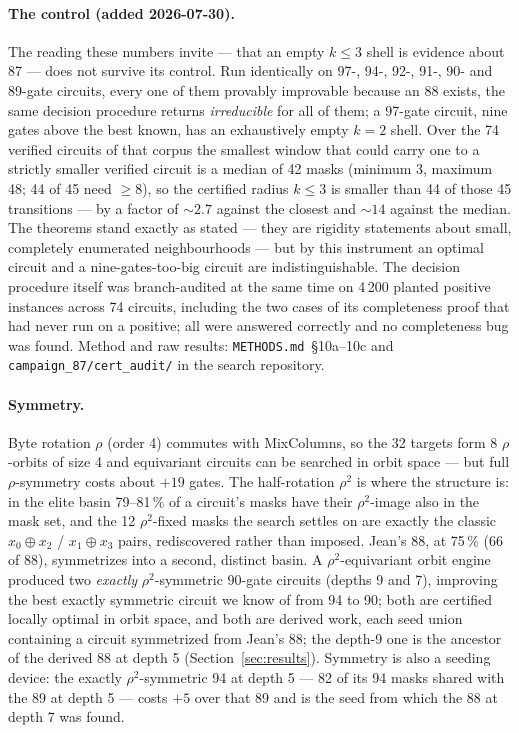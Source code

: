 \documentclass[11pt,a4paper]{article}
\begin{document}
\paragraph{The control (added 2026-07-30).} The reading these numbers invite ---
that an empty $k \le 3$ shell is evidence about 87 --- does not survive its
control. Run identically on 97-, 94-, 92-, 91-, 90- and 89-gate circuits, every
one of them provably improvable because an 88 exists, the same decision
procedure returns \emph{irreducible} for all of them; a 97-gate circuit, nine
gates above the best known, has an exhaustively empty $k=2$ shell. Over the 74
verified circuits of that corpus the smallest window that could carry one to a
strictly smaller verified circuit is a median of 42 masks (minimum 3, maximum
48; 44 of 45 need $\ge 8$), so the certified radius $k \le 3$ is smaller than 44
of those 45 transitions --- by a factor of ${\sim}2.7$ against the closest and
${\sim}14$ against the median. The theorems
stand exactly as stated --- they are rigidity statements about small, completely
enumerated neighbourhoods --- but by this instrument an optimal circuit and a
nine-gates-too-big circuit are indistinguishable. The decision procedure itself
was branch-audited at the same time on 4\,200 planted positive instances across
74 circuits, including the two cases of its completeness proof that had never
run on a positive; all were answered correctly and no completeness bug was
found. Method and raw results: \texttt{METHODS.md}~\S10a--10c and
\texttt{campaign\_87/cert\_audit/} in the search repository.

\paragraph{Symmetry.} Byte rotation $\rho$ (order 4) commutes with MixColumns,
so the 32 targets form 8 $\rho$-orbits of size 4 and equivariant circuits can be
searched in orbit space --- but full $\rho$-symmetry costs about $+19$ gates.
The half-rotation $\rho^2$ is where the structure is: in the elite basin
79--81\,\% of a circuit's masks have their $\rho^2$-image also in the mask set,
and the 12 $\rho^2$-fixed masks the search settles on are exactly the classic
$x_0 \oplus x_2$ / $x_1 \oplus x_3$ pairs, rediscovered rather than imposed.
Jean's 88, at 75\,\% (66 of 88), symmetrizes into a second, distinct basin. A
$\rho^2$-equivariant orbit engine produced two \emph{exactly}
$\rho^2$-symmetric 90-gate circuits (depths 9 and 7), improving the best
exactly symmetric circuit we know of from 94 to 90; both are certified locally
optimal in orbit space, and both are derived work, each seed union containing a
circuit symmetrized from Jean's 88; the depth-9 one is the ancestor of the
derived 88 at depth 5 (Section~\ref{sec:results}). Symmetry is also a seeding device: the
exactly $\rho^2$-symmetric 94 at depth 5 --- 82 of its 94 masks shared with the
89 at depth 5 --- costs $+5$ over that 89 and is the seed from which the 88 at
depth 7 was found.
\end{document}
